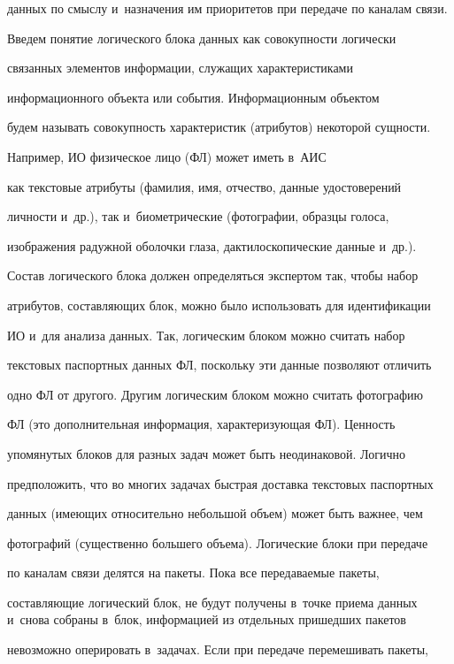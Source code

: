 данных по смыслу и~назначения им приоритетов при передаче по каналам связи.


  


  Введем понятие логического блока данных как со\-во\-куп\-ности логически 


связанных элементов информации, служащих характеристиками 


информационного объекта или события. Информационным объектом  


будем называть со\-во\-куп\-ность характеристик (атрибутов) некоторой сущ\-ности. 


Например, ИО физическое лицо (ФЛ) может иметь в~АИС 


как текс\-то\-вые атрибуты (фамилия, имя, отчество, данные удостоверений 


лич\-ности и~др.), так и~биометрические (фотографии, образцы голоса, 


изображения радужной оболочки глаза, дактилоскопические данные и~др.). 


Состав логического блока должен определяться экспертом так, чтобы набор 


атрибутов, со\-став\-ля\-ющих блок, мож\-но было использовать для идентификации 


ИО и~для анализа данных. Так, логическим блоком мож\-но считать набор 


текс\-то\-вых паспортных данных ФЛ, поскольку эти данные позволяют отличить 


одно ФЛ от другого. Другим логическим блоком можно считать фотографию 


ФЛ (это дополнительная информация, характеризующая ФЛ). Цен\-ность 


упомянутых блоков для разных задач может быть неодинаковой. Логично 


предположить, что во многих задачах быст\-рая до\-став\-ка текс\-то\-вых паспортных 


данных (имеющих относительно небольшой объем) может быть важ\-нее, чем 


фотографий (существенно большего объема). Логические блоки при передаче 


по каналам связи делятся на пакеты. Пока все пе\-ре\-да\-ва\-емые пакеты, 


со\-став\-ля\-ющие логический блок, не будут получены в~точке приема данных и~снова собраны в~блок, информацией из отдельных пришедших пакетов 


не\-воз\-мо\-жно оперировать в~задачах. Если при передаче перемешивать пакеты, 


